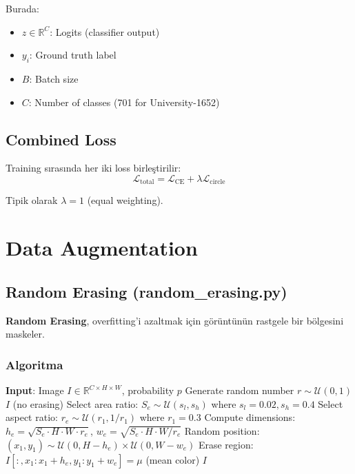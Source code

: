 \documentclass[12pt,a4paper]{article}
\begin{document}
Burada:
\begin{itemize}
    \item $z \in \mathbb{R}^{C}$: Logits (classifier output)
    \item $y_i$: Ground truth label
    \item $B$: Batch size
    \item $C$: Number of classes (701 for University-1652)
\end{itemize}

\subsection{Combined Loss}

Training sırasında her iki loss birleştirilir:
\begin{equation}
    \mathcal{L}_{\text{total}} = \mathcal{L}_{\text{CE}} + \lambda \mathcal{L}_{\text{circle}}
\end{equation}

Tipik olarak $\lambda = 1$ (equal weighting).

\section{Data Augmentation}

\subsection{Random Erasing (random\_erasing.py)}

\textbf{Random Erasing}, overfitting'i azaltmak için görüntünün rastgele bir bölgesini maskeler.

\subsubsection{Algoritma}
\begin{algorithm}[H]
\caption{Random Erasing}
\begin{algorithmic}[1]
\STATE \textbf{Input}: Image $I \in \mathbb{R}^{C \times H \times W}$, probability $p$
\STATE Generate random number $r \sim \mathcal{U}(0,1)$
    \RETURN $I$ \quad (no erasing)
\ENDIF
\STATE Select area ratio: $S_e \sim \mathcal{U}(s_l, s_h)$ where $s_l=0.02, s_h=0.4$
\STATE Select aspect ratio: $r_e \sim \mathcal{U}(r_1, 1/r_1)$ where $r_1=0.3$
\STATE Compute dimensions: $h_e = \sqrt{S_e \cdot H \cdot W \cdot r_e}$, $w_e = \sqrt{S_e \cdot H \cdot W / r_e}$
\STATE Random position: $(x_1, y_1) \sim \mathcal{U}(0, H-h_e) \times \mathcal{U}(0, W-w_e)$
\STATE Erase region: $I[:, x_1:x_1+h_e, y_1:y_1+w_e] = \mu$ (mean color)
\RETURN $I$
\end{algorithmic}
\end{algorithm}
\end{document}
